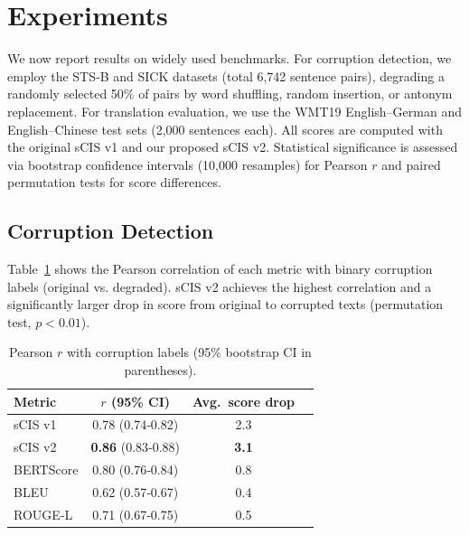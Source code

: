 \documentclass[11pt]{article}
\theoremstyle{definition}
\begin{document}
\section{Experiments}
We now report results on widely used benchmarks. For corruption detection, we employ the STS‑B and SICK datasets (total 6,742 sentence pairs), degrading a randomly selected 50\% of pairs by word shuffling, random insertion, or antonym replacement. For translation evaluation, we use the WMT19 English–German and English–Chinese test sets (2,000 sentences each). All scores are computed with the original sCIS v1 and our proposed sCIS v2. Statistical significance is assessed via bootstrap confidence intervals (10,000 resamples) for Pearson \(r\) and paired permutation tests for score differences.

\subsection{Corruption Detection}
Table~\ref{tab:corr} shows the Pearson correlation of each metric with binary corruption labels (original vs. degraded). sCIS v2 achieves the highest correlation and a significantly larger drop in score from original to corrupted texts (permutation test, \(p < 0.01\)).

\begin{table}[htbp]
\centering
\caption{Pearson \(r\) with corruption labels (95\% bootstrap CI in parentheses).}
\label{tab:corr}
\begin{tabular}{lccc}
\toprule
Metric & \(r\) (95\% CI) & Avg.\ score drop \\
\midrule
sCIS v1 & 0.78 (0.74‑0.82) & 2.3 \\
sCIS v2 & \textbf{0.86} (0.83‑0.88) & \textbf{3.1} \\
BERTScore & 0.80 (0.76‑0.84) & 0.8 \\
BLEU & 0.62 (0.57‑0.67) & 0.4 \\
ROUGE‑L & 0.71 (0.67‑0.75) & 0.5 \\
\bottomrule
\end{tabular}
\end{table}
\end{document}
